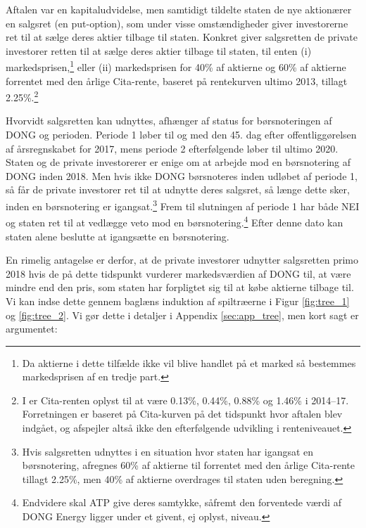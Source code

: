 \documentclass{article}
\begin{document}
Aftalen var en kapitaludvidelse, men samtidigt tildelte staten de nye aktionærer en salgsret (en put-option), som under visse omstændigheder giver investorerne ret til at sælge deres aktier tilbage til staten. Konkret giver salgsretten de private investorer retten til at sælge deres aktier tilbage til staten,  til enten (i) markedsprisen,\footnote{Da aktierne i dette tilfælde ikke vil blive handlet på et marked så bestemmes markedsprisen af en tredje part.} eller (ii) markedsprisen for 40\% af aktierne og 60\% af aktierne forrentet med den årlige Cita-rente, baseret på rentekurven ultimo 2013, tillagt 2.25\%.\footnote{I \citet{FM2013f} er Cita-renten oplyst til at være 0.13\%, 0.44\%, 0.88\% og 1.46\% i 2014--17. Forretningen er baseret på Cita-kurven på det tidspunkt hvor aftalen blev indgået, og afspejler altså ikke den efterfølgende udvikling i renteniveauet.}

Hvorvidt salgsretten kan udnyttes, afhænger af status for børsnoteringen af DONG og perioden. Periode 1 løber til og med den 45. dag efter offentliggørelsen af årsregnskabet for 2017, mens periode 2 efterfølgende løber til ultimo 2020. Staten og de private investorerer er enige om at arbejde mod en børsnotering af DONG inden 2018. Men hvis ikke DONG børsnoteres inden udløbet af periode 1, så får de private investorer ret til at udnytte deres salgsret, så længe dette sker, inden en børsnotering er igangsat.\footnote{Hvis salgsretten udnyttes i en situation hvor staten har igangsat en børsnotering, afregnes 60\% af aktierne til  forrentet med den årlige Cita-rente tillagt 2.25\%, men 40\% af aktierne overdrages til staten uden beregning.} Frem til slutningen af periode 1 har både NEI og staten ret til at vedlægge veto mod en børsnotering.\footnote{Endvidere skal ATP give deres samtykke, såfremt den forventede værdi af DONG Energy ligger under et givent, ej oplyst, niveau.} Efter denne dato kan staten alene beslutte at igangsætte en børsnotering.

En rimelig antagelse er derfor, at de private investorer udnytter salgsretten primo 2018 hvis de på dette tidspunkt vurderer markedsværdien af DONG til, at være mindre end den pris, som staten har forpligtet sig til at købe aktierne tilbage til. Vi kan indse dette gennem baglæns induktion af spiltræerne i Figur \ref{fig:tree_1} og \ref{fig:tree_2}. Vi gør dette i detaljer i Appendix \ref{sec:app_tree}, men kort sagt er argumentet:
\end{document}
